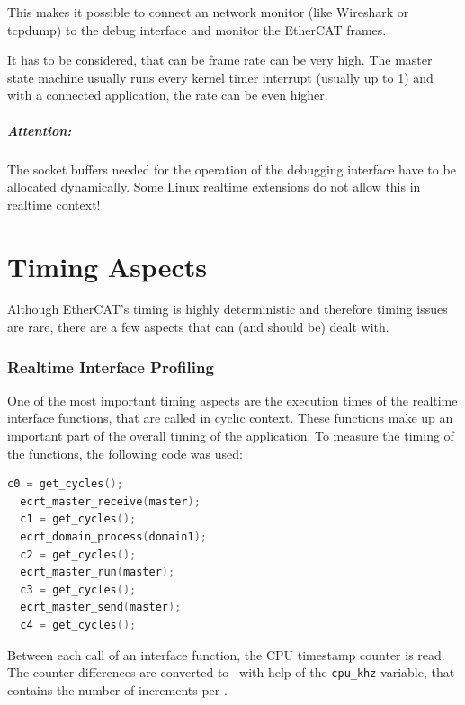 \documentclass[a4paper,12pt,BCOR6mm,bibtotoc,idxtotoc]{scrbook}
\begin{document}
This makes it possible to connect an network monitor (like Wireshark or
tcpdump) to the debug interface and monitor the EtherCAT frames.

It has to be considered, that can be frame rate can be very high. The master
state machine usually runs every kernel timer interrupt (usually up to
\unit{1}{\kilo\hertz}) and with a connected application, the rate can be even
higher.

\paragraph{Attention:} The socket buffers needed for the operation of
the debugging interface have to be allocated dynamically. Some Linux
realtime extensions do not allow this in realtime context!


\chapter{Timing Aspects}
\label{sec:timing}

Although EtherCAT's timing is highly deterministic and therefore timing issues
are rare, there are a few aspects that can (and should be) dealt with.


\subsection{Realtime Interface Profiling}
\label{sec:timing-profile}

One of the most important timing aspects are the execution times of the
realtime interface functions, that are called in cyclic context. These
functions make up an important part of the overall timing of the application.
To measure the timing of the functions, the following code was used:

\begin{lstlisting}[gobble=2,language=C]
  c0 = get_cycles();
  ecrt_master_receive(master);
  c1 = get_cycles();
  ecrt_domain_process(domain1);
  c2 = get_cycles();
  ecrt_master_run(master);
  c3 = get_cycles();
  ecrt_master_send(master);
  c4 = get_cycles();
\end{lstlisting}

Between each call of an interface function, the CPU timestamp counter is read.
The counter differences are converted to \micro\second\ with help of the
\lstinline+cpu_khz+ variable, that contains the number of increments per
\milli\second.
\end{document}
